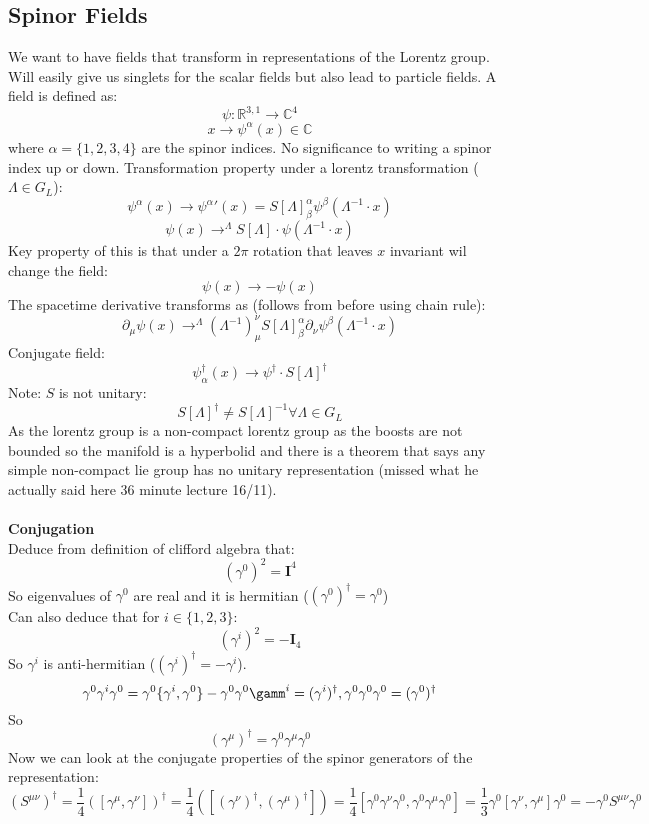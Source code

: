 \documentclass[12pt, a4paper, twoside, titlepage]{article}
\begin{document}
                                \subsection{Spinor Fields}
We want to have fields that transform in representations of the Lorentz group. Will easily give us singlets for the scalar fields but also lead to particle fields. A field is defined as:
$$
\psi: \mathbb{R}^{3,1} \rightarrow \mathbb{C}^4
$$
$$
x \rightarrow \psi^{\alpha}(x) \in \mathbb{C}
$$
where $\alpha = \{1,2,3,4\}$ are the spinor indices. No significance to writing a spinor index up or down. Transformation property under a lorentz transformation ($\Lambda \in G_L$):
$$
\psi^{\alpha}(x) \rightarrow \psi^{\alpha}'(x) = S[\Lambda]^{\alpha}_{\beta}\psi^{\beta}(\Lambda^{-1} \cdot x)
$$
$$
\psi(x) \rightarrow^{\Lambda} S[\Lambda] \cdot \psi(\Lambda^{-1} \cdot x)
$$
Key property of this is that under a $2\pi$ rotation that leaves $x$ invariant wil change the field:
$$
\psi(x) \rightarrow -\psi(x)
$$
The spacetime derivative transforms as (follows from before using chain rule):
$$
\partial_{\mu} \psi(x) \rightarrow^{\Lambda} (\Lambda^{-1})^{\nu}_{\mu}S[\Lambda]_{\beta}^{\alpha}\partial_{\nu}\psi^{\beta} (\Lambda^{-1} \cdot x) 
$$
Conjugate field:
$$
\psi^{\dagger}_{\alpha} (x) \rightarrow \psi^{\dagger} \cdot S[\Lambda]^{\dagger}
$$
Note: $S$ is not unitary:
$$
S[\Lambda]^{\dagger} \neq S[\Lambda]^{-1} \forall \Lambda \in G_L
$$
As the lorentz group is a non-compact lorentz group as the boosts are not bounded so the manifold is a hyperbolid and there is a theorem that says any simple non-compact lie group has no unitary representation (missed what he actually said here 36 minute lecture 16/11).\\\\
\textbf{Conjugation} \\
Deduce from definition of clifford algebra that:
$$
(\gamma^0)^2 = \bm I^4
$$
So eigenvalues of $\gamma^0$ are real and it is hermitian ($
(\gamma^0)^{\dagger} = \gamma^0
$)\\
Can also deduce that for $i \in \{1,2,3\}$:
$$
(\gamma^i)^2 = - \bm I_4
$$
So $\gamma^i$ is anti-hermitian ($(\gamma^i)^{\dagger}  = - \gamma^i$).
$$
\gamma^0 \gamma^i \gamma^0 = \gamma^0 \{\gamma^i, \gamma^0\} - \gamma^0 \gamma^0 \gamm^i = (\gamma^i)^{\dagger}, \gamma^0 \gamma^0 \gamma^0 = (\gamma^0)^{\dagger}
$$
So
$$
(\gamma^{\mu})^{\dagger} = \gamma^0 \gamma^{\mu} \gamma^0
$$
Now we can look at the conjugate properties of the spinor generators of the representation:
$$
(S^{\mu \nu})^{\dagger} = \frac{1}{4} ( [\gamma^{\mu}, \gamma^{\nu}])^{\dagger} = \frac{1}{4} ( [ (\gamma^{\nu})^{\dagger}, (\gamma^{\mu})^{\dagger}]) = \frac{1}{4} [ \gamma^0 \gamma^{\nu} \gamma^0, \gamma^0 \gamma^{\mu} \gamma^0] = \frac{1}{3} \gamma^0 [\gamma^{\nu}, \gamma^{\mu}] \gamma^0 = - \gamma^0 S^{\mu \nu} \gamma^0
$$
\end{document}
